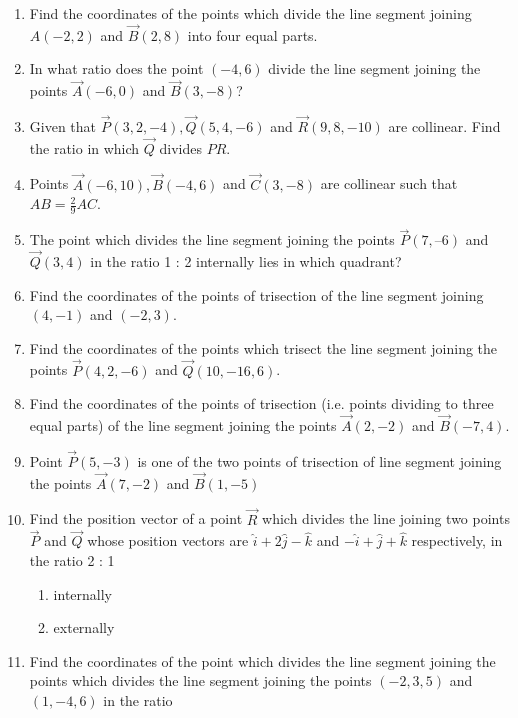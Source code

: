 \begin{enumerate}[label=\thesubsection.\arabic*,ref=\thesubsection.\theenumi]
\begin{enumerate}
		\solution
	
\item Find the coordinates of the points which divide the line segment joining $A(-2,2)$  and  $\vec{B}(2,8)$ into four equal parts.
	\\
		\solution
	
\item In what ratio does the point $(-4,6)$ divide the line segment joining the points $\vec{A}(-6,0)$ and $\vec{B}(3,-8)$?
\item Given that $\vec{P}(3,2,-4), \vec{Q}(5,4,-6)$ and $\vec{R}(9,8,-10)$ are collinear. Find the ratio in which $\vec{Q}$ divides $PR$.
\item Points $\vec{A}(-6,10),\vec{B}(-4,6)$  and  $\vec{C}(3,-8)$ are collinear such that $AB=  \frac{2}{9}AC$.
\item The point which divides the line segment joining the points $\vec{P} (7, –6) $  and  $\vec{Q}(3, 4)$ in the 
ratio 1 : 2 internally lies in  which quadrant?
\item Find the coordinates of the points of trisection of the line segment joining $(4,-1)$  and  $(-2,3)$.
	\\
		\solution
	
\item Find the coordinates of the points which trisect the line segment joining the points $\vec{P}(4,2,-6)$ and $\vec{Q}(10,-16,6)$.
\item Find the coordinates of the points of trisection (i.e. points dividing to three equal parts) of the line segment joining the points $\vec{A}(2,-2)$ and $\vec{B}(-7,4)$.
\item Point $\vec{P}(5,-3)$ is one of the two points of trisection of line segment joining the points $\vec{A}(7,-2)$ and $\vec{B}(1,-5)$
\item Find the position vector of a point $\vec{R}$ which divides the line joining two points $\vec{P}$
and $\vec{Q}$ whose position vectors are $\hat{i}+2\hat{j}-\hat{k}$ and $-\hat{i}+\hat{j}+\hat{k}$ respectively, in the
ratio 2 : 1
\begin{enumerate}
    \item  internally
    \item  externally
\end{enumerate}
%		
\item Find the coordinates of the point which divides the line segment joining the points which divides the line segment joining  the points $(-2,3,5)$ and $(1,-4,6)$ in the ratio 

\end{enumerate}
\end{enumerate}
